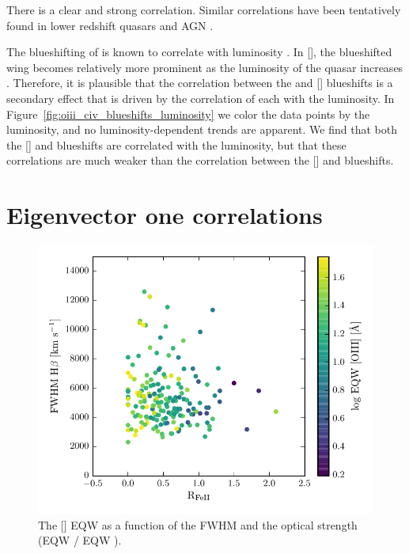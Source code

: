 There is a clear and strong correlation. 
Similar correlations have been tentatively found in lower redshift quasars and AGN \citep{zamanov02}. 


The blueshifting of  is known to correlate with luminosity \citep{richards11}.
In [], the blueshifted wing becomes relatively more prominent as the luminosity of the quasar increases \citep{shen14}. 
Therefore, it is plausible that the correlation between the  and [] blueshifts is a secondary effect that is driven by the correlation of each with the luminosity. 
In Figure~\ref{fig:oiii_civ_blueshifts_luminosity} we color the data points by the luminosity, and no luminosity-dependent trends are apparent. 
We find that both the [] and  blueshifts are correlated with the luminosity, but that these correlations are much weaker than the correlation between the [] and  blueshifts. 

\section{Eigenvector one correlations}

\begin{figure}
    \includegraphics[width=\columnwidth]{figures/chapter04/ev1.pdf} 
    \caption{The [] EQW as a function of the \hb FWHM and the optical  strength (EQW / EQW \hb).}     
    \label{fig:ev1}
\end{figure}

